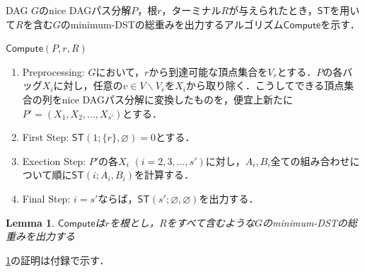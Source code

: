 \documentclass[master]{kuisthesis}		%
\theoremstyle{plain}
\newtheorem{lemma}{Lemma}
\theoremstyle{definition}
\begin{document}
    



DAG $G$のnice DAGパス分解$P$，根$r$，ターミナル$R$が与えられたとき，$\mathsf{ST}$を用いて$R$を含む$G$のminimum-DSTの総重みを出力するアルゴリズム$\mathsf{Compute}$を示す．


$\mathsf{Compute}(P, r, R)$


\begin{enumerate}
    \item Preprocessing: $G$において，$r$から到達可能な頂点集合を$V_r$とする．$P$の各バッグ$X_i$に対し，任意の$v \in V \backslash V_r$を$X_i$から取り除く．こうしてできる頂点集合の列をnice DAGパス分解に変換したものを，便宜上新たに$P' = (X_1, X_2, \dots , X_{s'})$とする．
    \item First Step: $\mathsf{ST}(1; \{r\}, \varnothing) = 0$とする．
    \item Exection Step: $P'$の各$X_i$ $(i=2, 3, \dots, s')$に対し，$A_i, B_i$全ての組み合わせについて順に$\mathsf{ST}(i; A_i, B_i)$を計算する．
    \item Final Step: $i = s'$ならば，$\mathsf{ST}(s'; \varnothing, \varnothing)$を出力する．
\end{enumerate}


\begin{lemma}\label{dst}
    $\mathsf{Compute}$は$r$を根とし，$R$をすべて含むような$G$のminimum-DSTの総重みを出力する
\end{lemma}

\ref{dst}の証明は付録で示す．
\end{document}
